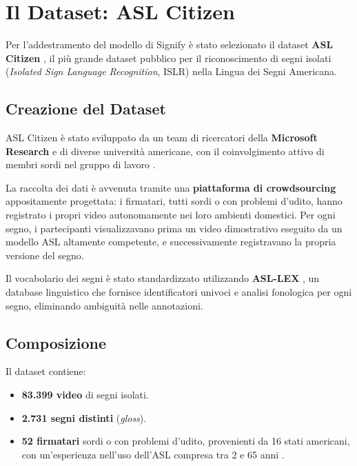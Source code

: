 
\section{Il Dataset: ASL Citizen}

Per l'addestramento del modello di Signify è stato selezionato il dataset \textbf{ASL Citizen} \cite{desai2024aslcitizen}, il più grande dataset pubblico per il riconoscimento di segni isolati (\textit{Isolated Sign Language Recognition}, ISLR) nella Lingua dei Segni Americana.

\subsection{Creazione del Dataset}

ASL Citizen è stato sviluppato da un team di ricercatori della \textbf{Microsoft Research} e di diverse università americane, con il coinvolgimento attivo di membri sordi nel gruppo di lavoro \cite{desai2024aslcitizen}.

La raccolta dei dati è avvenuta tramite una \textbf{piattaforma di crowdsourcing} appositamente progettata: i firmatari, tutti sordi o con problemi d'udito, hanno registrato i propri video autonomamente nei loro ambienti domestici. Per ogni segno, i partecipanti visualizzavano prima un video dimostrativo eseguito da un modello ASL altamente competente, e successivamente registravano la propria versione del segno.

Il vocabolario dei segni è stato standardizzato utilizzando \textbf{ASL-LEX} \cite{asllex2017}, un database linguistico che fornisce identificatori univoci e analisi fonologica per ogni segno, eliminando ambiguità nelle annotazioni.

\subsection{Composizione}

Il dataset contiene:
\begin{itemize}
    \item \textbf{83.399 video} di segni isolati.
    \item \textbf{2.731 segni distinti} (\textit{gloss}).
    \item \textbf{52 firmatari} sordi o con problemi d'udito, provenienti da 16 stati americani, con un'esperienza nell'uso dell'ASL compresa tra 2 e 65 anni \cite{desai2024aslcitizen}.
\end{itemize}

